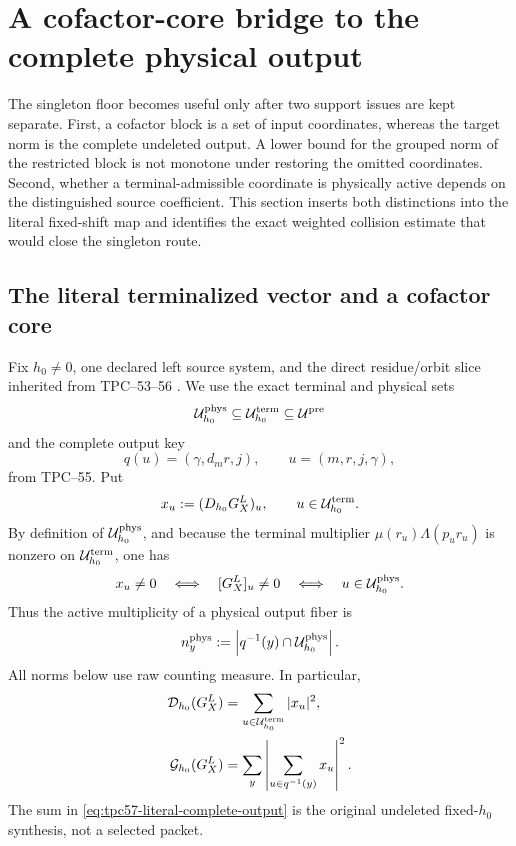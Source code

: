 \section{A cofactor-core bridge to the complete physical output}
\label{sec:tpc57-block-bridge}

The singleton floor becomes useful only after two support issues are kept
separate.  First, a cofactor block is a set of input coordinates, whereas
the target norm is the complete undeleted output.  A lower bound for the
grouped norm of the restricted block is not monotone under restoring the
omitted coordinates.  Second, whether a terminal-admissible coordinate is
physically active depends on the distinguished source coefficient.  This
section inserts both distinctions into the literal fixed-shift map and
identifies the exact weighted collision estimate that would close the
singleton route.

\subsection{The literal terminalized vector and a cofactor core}

Fix \(h_0\ne0\), one declared left source system, and the direct
residue/orbit slice inherited from TPC--53--56
\citep{WangTPC53,WangTPC55,WangTPC56}.  We use the exact terminal and
physical sets
\[
 \mathcal U_{h_0}^{\rm phys}\subseteq
 \mathcal U_{h_0}^{\rm term}\subseteq\mathcal U^{\rm pre}
\]
and the complete output key
\begin{equation}
 q(u)=(\gamma,d_mr,j),
 \qquad u=(m,r,j,\gamma),
 \label{eq:tpc57-literal-output-key}
\end{equation}
from TPC--55.  Put
\begin{equation}
 x_u:=(D_{h_0}G_X^L)_u,
 \qquad u\in\mathcal U_{h_0}^{\rm term}.
 \label{eq:tpc57-literal-terminalized-vector}
\end{equation}
By definition of \(\mathcal U_{h_0}^{\rm phys}\), and because the terminal
multiplier \(\mu(r_u)\Lambda(p_ur_u)\) is nonzero on
\(\mathcal U_{h_0}^{\rm term}\), one has
\begin{equation}
 x_u\ne0
 \quad\Longleftrightarrow\quad
 [G_X^L]_u\ne0
 \quad\Longleftrightarrow\quad
 u\in\mathcal U_{h_0}^{\rm phys}.
 \label{eq:tpc57-terminal-physical-equivalence}
\end{equation}
Thus the active multiplicity of a physical output fiber is
\begin{equation}
 n_y^{\rm phys}
 :=\left|q^{-1}(y)\cap\mathcal U_{h_0}^{\rm phys}\right|.
 \label{eq:tpc57-physical-fiber-degree}
\end{equation}
All norms below use raw counting measure.  In particular,
\begin{align}
 \mathcal D_{h_0}(G_X^L)
 &=\sum_{u\in\mathcal U_{h_0}^{\rm term}}|x_u|^2,
 \label{eq:tpc57-literal-terminal-diagonal}\\
 \mathcal G_{h_0}(G_X^L)
 &=\sum_y\left|\sum_{u\in q^{-1}(y)}x_u\right|^2.
 \label{eq:tpc57-literal-complete-output}
\end{align}
The sum in \eqref{eq:tpc57-literal-complete-output} is the original
undeleted fixed-\(h_0\) synthesis, not a selected packet.

